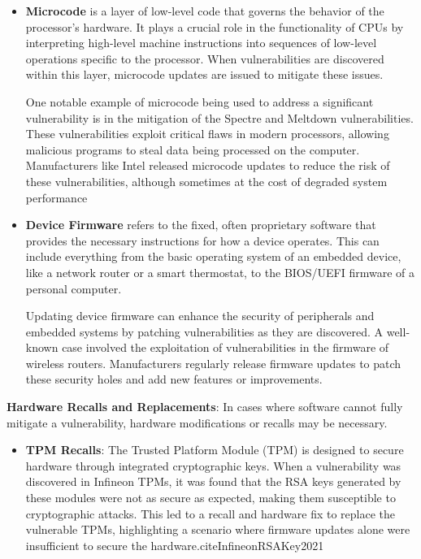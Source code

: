 \begin{itemize}
\item
  \textbf{Microcode} is a layer of low-level code that governs the behavior of the processor's hardware. It plays a crucial role in the functionality of CPUs by interpreting high-level machine instructions into sequences of low-level operations specific to the processor. When vulnerabilities are discovered within this layer, microcode updates are issued to mitigate these issues.\cite{kentEncyclopediaComputerScience1993}

  One notable example of microcode being used to address a significant vulnerability is in the mitigation of the Spectre and Meltdown vulnerabilities. These vulnerabilities exploit critical flaws in modern processors, allowing malicious programs to steal data being processed on the computer. Manufacturers like Intel released microcode updates to reduce the risk of these vulnerabilities, although sometimes at the cost of degraded system performance \cite{burkeIntelUnleashesComprehensive}
\item
  \textbf{Device Firmware} refers to the fixed, often proprietary software that provides the necessary instructions for how a device operates. This can include everything from the basic operating system of an embedded device, like a network router or a smart thermostat, to the BIOS/UEFI firmware of a personal computer.\cite{WhatFirmware2013}

  Updating device firmware can enhance the security of peripherals and embedded systems by patching vulnerabilities as they are discovered. A well-known case involved the exploitation of vulnerabilities in the firmware of wireless routers. Manufacturers regularly release firmware updates to patch these security holes and add new features or improvements.

\end{itemize}

\textbf{Hardware Recalls and Replacements}: In cases where software
cannot fully mitigate a vulnerability, hardware modifications or recalls
may be necessary.

\begin{itemize}
\item
  \textbf{TPM Recalls}: The Trusted Platform Module (TPM) is designed to secure hardware through integrated cryptographic keys. When a vulnerability was discovered in Infineon TPMs, it was found that the RSA keys generated by these modules were not as secure as expected, making them susceptible to cryptographic attacks. This led to a recall and hardware fix to replace the vulnerable TPMs, highlighting a scenario where firmware updates alone were insufficient to secure the hardware.cite{InfineonRSAKey2021}
\end{itemize}


